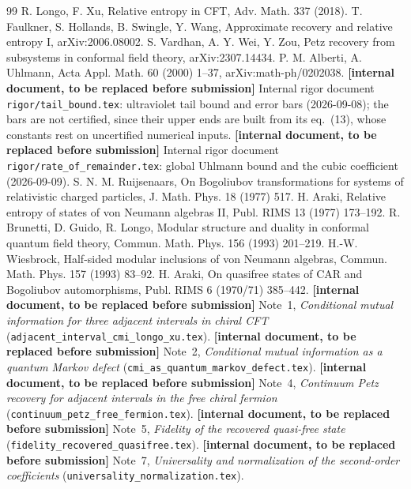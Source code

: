 \documentclass[11pt,a4paper]{article}
\theoremstyle{definition}\newtheorem{definition}[theorem]{Definition}\newtheorem{remark}[theorem]{Remark}
\begin{document}
\begin{thebibliography}{99}
 R. Longo, F. Xu, Relative entropy in CFT, Adv. Math. 337 (2018).
 T. Faulkner, S. Hollands, B. Swingle, Y. Wang, Approximate recovery and relative entropy I, arXiv:2006.08002.
 S. Vardhan, A. Y. Wei, Y. Zou, Petz recovery from subsystems in conformal field theory, arXiv:2307.14434.
 P. M. Alberti, A. Uhlmann, Acta Appl. Math. 60 (2000) 1--37, arXiv:math-ph/0202038.
 \textbf{[internal document, to be replaced before submission]} Internal rigor document \texttt{rigor/tail\_bound.tex}: ultraviolet tail bound and error bars (2026-09-08); the bars are not certified, since their upper ends are built from its eq.~(13), whose constants rest on uncertified numerical inputs.
 \textbf{[internal document, to be replaced before submission]} Internal rigor document \texttt{rigor/rate\_of\_remainder.tex}: global Uhlmann bound and the cubic coefficient (2026-09-09).
 S. N. M. Ruijsenaars, On Bogoliubov transformations for systems of relativistic charged particles, J. Math. Phys. 18 (1977) 517.
 H. Araki, Relative entropy of states of von Neumann algebras II, Publ. RIMS 13 (1977) 173--192.
 R. Brunetti, D. Guido, R. Longo, Modular structure and duality in conformal quantum field theory, Commun. Math. Phys. 156 (1993) 201--219.
 H.-W. Wiesbrock, Half-sided modular inclusions of von Neumann algebras, Commun. Math. Phys. 157 (1993) 83--92.
 H. Araki, On quasifree states of CAR and Bogoliubov automorphisms, Publ. RIMS 6 (1970/71) 385--442.
 \textbf{[internal document, to be replaced before submission]} Note~1, \emph{Conditional mutual information for three adjacent intervals in chiral CFT} (\texttt{adjacent\_interval\_cmi\_longo\_xu.tex}).
 \textbf{[internal document, to be replaced before submission]} Note~2, \emph{Conditional mutual information as a quantum Markov defect} (\texttt{cmi\_as\_quantum\_markov\_defect.tex}).
 \textbf{[internal document, to be replaced before submission]} Note~4, \emph{Continuum Petz recovery for adjacent intervals in the free chiral fermion} (\texttt{continuum\_petz\_free\_fermion.tex}).
 \textbf{[internal document, to be replaced before submission]} Note~5, \emph{Fidelity of the recovered quasi-free state} (\texttt{fidelity\_recovered\_quasifree.tex}).
 \textbf{[internal document, to be replaced before submission]} Note~7, \emph{Universality and normalization of the second-order coefficients} (\texttt{universality\_normalization.tex}).

\end{thebibliography}
\end{document}
